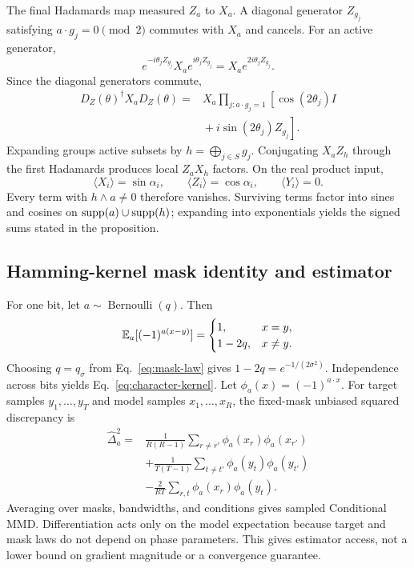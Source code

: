 The final Hadamards map measured $Z_a$ to $X_a$.  A diagonal generator
$Z_{g_j}$ satisfying $a\cdot g_j=0\pmod2$ commutes with $X_a$ and cancels.
For an active generator,
\begin{equation}
 e^{-i\theta_jZ_{g_j}}X_ae^{i\theta_jZ_{g_j}}
 =X_ae^{2i\theta_jZ_{g_j}}.
\end{equation}
Since the diagonal generators commute,
\begin{equation}
 \begin{split}
 D_Z(\theta)^\dagger X_aD_Z(\theta)={}&X_a
 \prod_{j:a\cdot g_j=1}\left[\cos(2\theta_j)I\right.\\
 &\left.{}+i\sin(2\theta_j)Z_{g_j}\right].
 \end{split}
 \label{eq:active-product}
\end{equation}
Expanding groups active subsets by $h=\bigoplus_{j\in S}g_j$.  Conjugating
$X_aZ_h$ through the first Hadamards produces local $Z_aX_h$ factors.  On the
real product input,
\begin{equation}
 \langle X_i\rangle=\sin\alpha_i,\qquad
 \langle Z_i\rangle=\cos\alpha_i,\qquad
 \langle Y_i\rangle=0.
\end{equation}
Every term with $h\wedge a\ne0$ therefore vanishes.  Surviving terms factor
into sines and cosines on $\operatorname{supp}(a)\cup\operatorname{supp}(h)$; expanding into exponentials
yields the signed sums stated in the proposition.

\subsection{Hamming-kernel mask identity and estimator}

For one bit, let $a\sim\operatorname{Bernoulli}(q)$.  Then
\begin{equation}
 \mathbb{E}_a[(-1)^{a(x-y)}]=
 \begin{cases}1,&x=y,\\1-2q,&x\ne y.\end{cases}
\end{equation}
Choosing $q=q_\sigma$ from Eq.~\eqref{eq:mask-law} gives
$1-2q=e^{-1/(2\sigma^2)}$.  Independence across bits yields
Eq.~\eqref{eq:character-kernel}.  Let
$\phi_a(x)=(-1)^{a\cdot x}$.  For target samples $y_1,\ldots,y_T$ and model
samples $x_1,\ldots,x_R$, the fixed-mask unbiased squared discrepancy is
\begin{align}
 \widehat\Delta_a^2={}&
 \frac{1}{R(R-1)}\sum_{r\ne r'}\phi_a(x_r)\phi_a(x_{r'})
 \nonumber\\
 &+\frac{1}{T(T-1)}\sum_{t\ne t'}\phi_a(y_t)\phi_a(y_{t'})
 \nonumber\\
 &-\frac{2}{RT}\sum_{r,t}\phi_a(x_r)\phi_a(y_t).
 \label{eq:mask-u-stat}
\end{align}
Averaging over masks, bandwidths, and conditions gives sampled Conditional
MMD.  Differentiation acts only on the model expectation because target and
mask laws do not depend on phase parameters.  This gives estimator access,
not a lower bound on gradient magnitude or a convergence guarantee.

